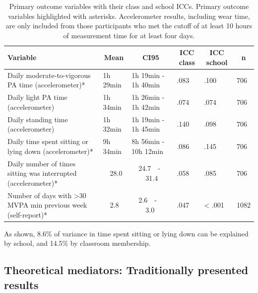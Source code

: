 \documentclass[english,floatsintext,]{apa6}
\theoremstyle{definition}
\theoremstyle{definition}
\theoremstyle{definition}
\theoremstyle{remark}
\begin{document}
\begin{table}[tbp]
\begin{center}
\begin{threeparttable}
\caption{\label{tab:primary-outcome-vars-table-total}Primary outcome variables with their class and school ICCs. Primary outcome variables highlighted with asterisks. Accelerometer results, including wear time, are only included from those participants who met the cutoff of at least 10 hours of measurement time for at least four days.}
\begin{tabular}{llllll}
\toprule
Variable & \multicolumn{1}{c}{Mean} & \multicolumn{1}{c}{CI95} & \multicolumn{1}{c}{ICC class} & \multicolumn{1}{c}{ICC school} & \multicolumn{1}{c}{n}\\
\midrule
Daily moderate-to-vigorous PA time (accelerometer)* & 1h 29min & 1h 19min - 1h 40min & .083 & .100 & 706\\
Daily light PA time (accelerometer) & 1h 34min & 1h 26min - 1h 42min & .074 & .074 & 706\\
Daily standing time (accelerometer) & 1h 32min & 1h 19min - 1h 45min & .140 & .098 & 706\\
Daily time spent sitting or lying down (accelerometer)* & 9h 34min & 8h 56min - 10h 12min & .086 & .145 & 706\\
Daily number of times sitting was interrupted (accelerometer)* & \ \ 28.0 & \ \ 24.7\ \ -\ \ \ \ 31.4 & .058 & .085 & 706\\
Number of days with >30 MVPA min previous week (self-report)* & \ \  2.8 & \ \  2.6\ \ -\ \ \ \  3.0 & .047 & < .001 & 1082\\
\bottomrule
\end{tabular}
\end{threeparttable}
\end{center}
\end{table}

As shown, 8.6\% of variance in time spent sitting or lying down can be
explained by school, and 14.5\% by classroom membership.

\subsection{Theoretical mediators: Traditionally presented
results}\label{theoretical-mediators-traditionally-presented-results}
\end{document}
